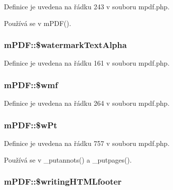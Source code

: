 Definice je uvedena na řádku 243 v souboru mpdf.\-php.



Používá se v m\-P\-D\-F().

\hypertarget{classm_p_d_f_af23e6616d8015797919f1dd5ed983dd4}{
\subsubsection[{\$watermark\-Text\-Alpha}]{\setlength{\rightskip}{0pt plus 5cm}m\-P\-D\-F\-::\$watermark\-Text\-Alpha}}\label{classm_p_d_f_af23e6616d8015797919f1dd5ed983dd4}


Definice je uvedena na řádku 161 v souboru mpdf.\-php.

\hypertarget{classm_p_d_f_aded5d1a3023505e308ae36db6d961ba0}{
\subsubsection[{\$wmf}]{\setlength{\rightskip}{0pt plus 5cm}m\-P\-D\-F\-::\$wmf}}\label{classm_p_d_f_aded5d1a3023505e308ae36db6d961ba0}


Definice je uvedena na řádku 264 v souboru mpdf.\-php.

\hypertarget{classm_p_d_f_a0ab8fec70d0dbf7a92733831497f5fa4}{
\subsubsection[{\$w\-Pt}]{\setlength{\rightskip}{0pt plus 5cm}m\-P\-D\-F\-::\$w\-Pt}}\label{classm_p_d_f_a0ab8fec70d0dbf7a92733831497f5fa4}


Definice je uvedena na řádku 757 v souboru mpdf.\-php.



Používá se v \-\_\-putannots() a \-\_\-putpages().

\hypertarget{classm_p_d_f_a60171c302851f953848b83d7b7020281}{
\subsubsection[{\$writing\-H\-T\-M\-Lfooter}]{\setlength{\rightskip}{0pt plus 5cm}m\-P\-D\-F\-::\$writing\-H\-T\-M\-Lfooter}}\label{classm_p_d_f_a60171c302851f953848b83d7b7020281}


